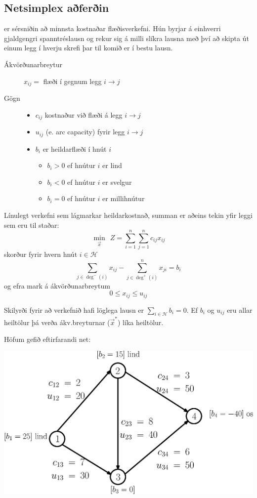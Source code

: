 \subsection{Netsimplex aðferðin}
 er sérsniðin að minnsta kostnaðar flæðisverkefni. Hún byrjar á einhverri gjaldgengri spanntréslausn og rekur sig á milli slíkra lausna með  því að skipta út einum legg í hverju skrefi  þar til komið er í bestu lausn.
\begin{description}
 \item[Ákvörðunarbreytur]$x_{ij} = $ flæði í gegnum legg $i \rightarrow j$
 \item[Gögn]\hspace{.1cm}
\begin{itemize}
\item $c_{ij}$ kostnaður við flæði á legg $i\to j$
\item $u_{ij}$  (e. arc capacity) fyrir legg $i\to j$
\item $b_i$ er heildarflæði í hnút $i$
\begin{itemize}
\item $b_i > 0$ ef hnútur $i$ er lind
\item $b_i < 0$ ef hnútur $i$ er svelgur
\item $b_i = 0$ ef hnútur $i$ er millihnútur
\end{itemize}
\end{itemize}
\end{description}
Línulegt verkefni sem lágmarkar heildarkostnað, summan er aðeins tekin yfir leggi sem eru til staðar:
$$\min_\vec{x} ~~  Z = \sum_{i=1}^{n}\sum_{j=1}^{n}c_{ij}x_{ij}$$
skorður fyrir hvern hnút $i\in\mathcal{H}$
$$\sum_{j\in \deg^-(i)} x_{ij}-\sum_{j\in\deg^+(i)}^n x_{ji}=b_i$$
og efra mark á ákvörðunarbreytum
$$0 \le x_{ij} \le u_{ij}$$

\begin{samepage}\begin{aths}Skilyrði fyrir að verkefnið hafi löglega lausn er \mbox{$\sum_{i\in\mathcal{H}} b_i = 0$}.
Ef $b_i$ og $u_{ij}$ eru allar heiltölur þá verða ákv.breyturnar ($\vec{x}^*$) líka heiltölur.
\end{aths}\end{samepage}

\begin{daemi}Höfum gefið eftirfarandi net:
\begin{center}
\includegraphics[width=0.9\columnwidth]{figs/netsimplex.eps} 
\end{center}
\end{daemi}


